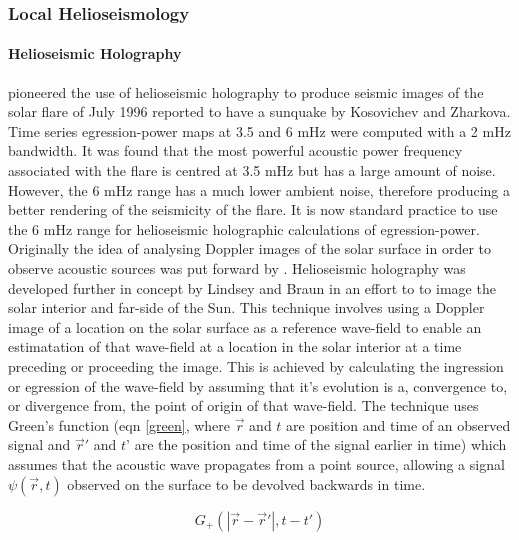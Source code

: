 \subsubsection{Local Helioseismology}

\paragraph{Helioseismic Holography}\label{helioholog}
\cite{1999ApJ...513L.143D} pioneered the use of helioseismic holography to produce seismic images of the solar flare of July 1996 reported to have a sunquake by Kosovichev and Zharkova. Time series egression-power maps at 3.5 and 6 mHz were computed with a 2 mHz bandwidth. It was found that the most powerful acoustic power frequency associated with the flare is centred at 3.5 mHz but has a large amount of noise. However, the 6 mHz range has a much lower ambient noise, therefore producing a better rendering of the seismicity of the flare. It is now standard practice to use the 6 mHz range for helioseismic holographic calculations of egression-power. \\
Originally the idea of analysing Doppler images of the solar surface in order to observe acoustic sources was put forward by \cite{1975CRASB.281...93R}. Helioseismic holography was developed further in concept by Lindsey and Braun \citep{1990SoPh..126..101L, 1992ApJ...392..739B, 1997ApJ...485..895L} in an effort to to image the solar interior and far-side of the Sun. This technique involves using a Doppler image of a location on the solar surface as a reference wave-field to enable an estimatation of that wave-field at a location in the solar interior at a time preceding or proceeding the image. This is achieved by calculating the ingression or egression of the wave-field by assuming that it's evolution is a, convergence to, or divergence from, the point of origin of that wave-field. The technique uses Green's function (eqn \ref{green}, where $\vec{r}$ and $t$ are position and time of an observed signal and $\vec{r}'$ and $t$' are the position and time of the signal earlier in time) which assumes that the acoustic wave propagates from a point source, allowing a signal $\psi(\vec{r},t)$ observed on the surface to be devolved backwards in time.

\begin{equation}\label{green}
G_{+}(|\vec{r}-\vec{r}'|,t-t')
\end{equation}

